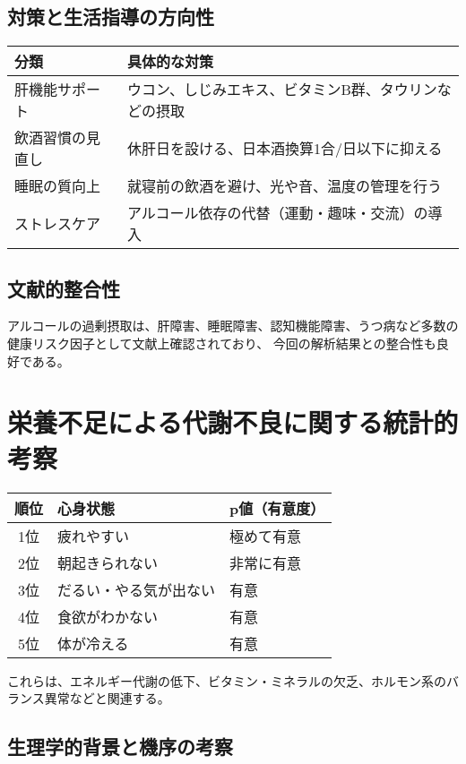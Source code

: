 \documentclass[a4paper,12pt]{article}
\begin{document}
\subsection*{対策と生活指導の方向性}

\begin{table}[H]
\centering
\begin{tabular}{|l|p{10cm}|}
\hline
分類 & 具体的な対策 \\
\hline
肝機能サポート & ウコン、しじみエキス、ビタミンB群、タウリンなどの摂取 \\
飲酒習慣の見直し & 休肝日を設ける、日本酒換算1合/日以下に抑える \\
睡眠の質向上 & 就寝前の飲酒を避け、光や音、温度の管理を行う \\
ストレスケア & アルコール依存の代替（運動・趣味・交流）の導入 \\
\hline
\end{tabular}
\end{table}

\subsection*{文献的整合性}

アルコールの過剰摂取は、肝障害、睡眠障害、認知機能障害、うつ病など多数の健康リスク因子として文献上確認されており、  
今回の解析結果との整合性も良好である。


\section{栄養不足による代謝不良に関する統計的考察}

\begin{table}[H]
\centering
\begin{tabular}{|c|l|l|}
\hline
順位 & 心身状態 & p値（有意度） \\
\hline
1位 & 疲れやすい & 極めて有意 \\
2位 & 朝起きられない & 非常に有意 \\
3位 & だるい・やる気が出ない & 有意 \\
4位 & 食欲がわかない & 有意 \\
5位 & 体が冷える & 有意 \\
\hline
\end{tabular}
\end{table}

これらは、エネルギー代謝の低下、ビタミン・ミネラルの欠乏、ホルモン系のバランス異常などと関連する。

\subsection*{生理学的背景と機序の考察}
\end{document}
